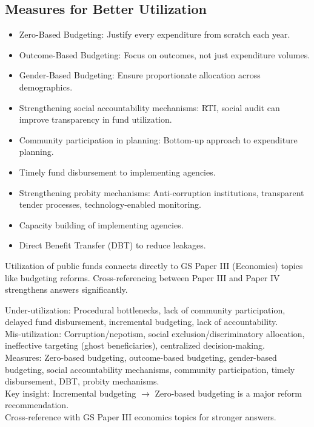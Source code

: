 \subsection{Measures for Better Utilization}
\begin{itemize}
\item Zero-Based Budgeting: Justify every expenditure from scratch each year.
\item Outcome-Based Budgeting: Focus on outcomes, not just expenditure volumes.
\item Gender-Based Budgeting: Ensure proportionate allocation across demographics.
\item Strengthening social accountability mechanisms: RTI, social audit can improve transparency in fund utilization.
\item Community participation in planning: Bottom-up approach to expenditure planning.
\item Timely fund disbursement to implementing agencies.
\item Strengthening probity mechanisms: Anti-corruption institutions, transparent tender processes, technology-enabled monitoring.
\item Capacity building of implementing agencies.
\item Direct Benefit Transfer (DBT) to reduce leakages.
\end{itemize}

\begin{CriticalPoint}
Utilization of public funds connects directly to GS Paper III (Economics) topics like budgeting reforms. Cross-referencing between Paper III and Paper IV strengthens answers significantly.
\end{CriticalPoint}

\begin{QuickRevision}
Under-utilization: Procedural bottlenecks, lack of community participation, delayed fund disbursement, incremental budgeting, lack of accountability.\\
Mis-utilization: Corruption/nepotism, social exclusion/discriminatory allocation, ineffective targeting (ghost beneficiaries), centralized decision-making.\\
Measures: Zero-based budgeting, outcome-based budgeting, gender-based budgeting, social accountability mechanisms, community participation, timely disbursement, DBT, probity mechanisms.\\
Key insight: Incremental budgeting $\rightarrow$ Zero-based budgeting is a major reform recommendation.\\
Cross-reference with GS Paper III economics topics for stronger answers.
\end{QuickRevision}

